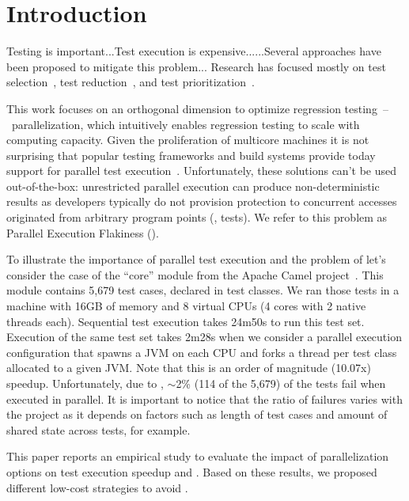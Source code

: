 \section{Introduction}

\sloppy Testing is important...Test execution is
expensive......Several approaches have been proposed to
mitigate this problem... Research has focused mostly on test
selection~, test reduction~, and test
prioritization~.

This work focuses on an orthogonal dimension to optimize regression
testing~--~parallelization, which intuitively enables regression
testing to scale with computing capacity.  Given the proliferation of
multicore machines it is not surprising that popular testing
frameworks and build systems provide today support for parallel test
execution~.  Unfortunately, these solutions can't be used
out-of-the-box: unrestricted parallel execution can produce
non-deterministic results as developers typically do not provision
protection to concurrent accesses originated from arbitrary program
points (\ie{}, tests).  We refer to this problem as Parallel Execution
Flakiness (\pef{}).

To illustrate the importance of parallel test execution and the
problem of \pef{} let's consider the case of the ``core'' module from
the Apache Camel project~\cite{apache-camel-web}.  This module
contains 5,679 test cases, declared in  test classes.  We ran
those tests in a machine with 16GB of memory and 8 virtual CPUs (4
cores with 2 native threads each).  Sequential test execution takes
24m50s to run this test set.  Execution of the same test set takes
2m28s when we consider a parallel execution configuration that spawns
a JVM on each CPU and forks a thread per test class allocated to a
given JVM.  Note that this is an order of magnitude (10.07x)
speedup.  Unfortunately, due to \pef{}, $\sim$2\% (114 of the 5,679)
of the tests fail when executed in parallel.  It is important to
notice that the ratio of failures varies with the project as it
depends on factors such as length of test cases and amount of shared
state across tests, for example.

This paper reports an empirical study to evaluate the impact of
parallelization options on test execution speedup and \pef{}. Based on
these results, we proposed different low-cost strategies to avoid
\pef{}.


